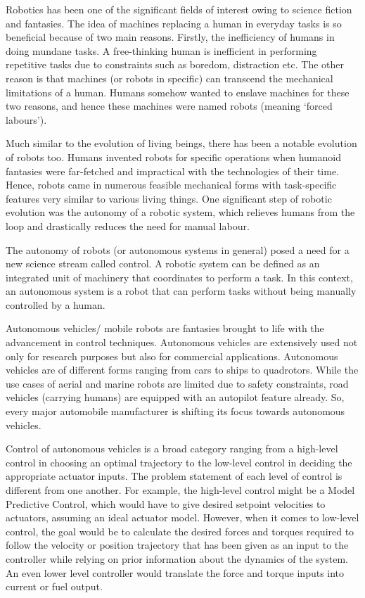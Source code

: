 Robotics has been one of the significant fields of interest owing to science fiction and fantasies. The idea of machines replacing a human in everyday tasks is so beneficial because of two main reasons. Firstly, the inefficiency of humans in doing mundane tasks. A free-thinking human is inefficient in performing repetitive tasks due to constraints such as boredom, distraction etc. The other reason is that machines (or robots in specific) can transcend the mechanical limitations of a human. Humans somehow wanted to enslave machines for these two reasons, and hence these machines were named robots (meaning `forced labours'). 

Much similar to the evolution of living beings, there has been a notable evolution of robots too. Humans invented robots for specific operations when humanoid fantasies were far-fetched and impractical with the technologies of their time. Hence, robots came in numerous feasible mechanical forms with task-specific features very similar to various living things. One significant step of robotic evolution was the autonomy of a robotic system, which relieves humans from the loop and drastically reduces the need for manual labour.

The autonomy of robots (or autonomous systems in general) posed a need for a new science stream called control. A robotic system can be defined as an integrated unit of machinery that coordinates to perform a task. In this context, an autonomous system is a robot that can perform tasks without being manually controlled by a human.

Autonomous vehicles/ mobile robots are fantasies brought to life with the advancement in control techniques. Autonomous vehicles are extensively used not only for research purposes but also for commercial applications. Autonomous vehicles are of different forms ranging from cars to ships to quadrotors. While the use cases of aerial and marine robots are limited due to safety constraints, road vehicles (carrying humans) are equipped with an autopilot feature already. So, every major automobile manufacturer is shifting its focus towards autonomous vehicles.

Control of autonomous vehicles is a broad category ranging from a high-level control in choosing an optimal trajectory to the low-level control in deciding the appropriate actuator inputs. The problem statement of each level of control is different from one another. For example, the high-level control might be a Model Predictive Control, which would have to give desired setpoint velocities to actuators, assuming an ideal actuator model. However, when it comes to low-level control, the goal would be to calculate the desired forces and torques required to follow the velocity or position trajectory that has been given as an input to the controller while relying on prior information about the dynamics of the system. An even lower level controller would translate the force and torque inputs into current or fuel output.





